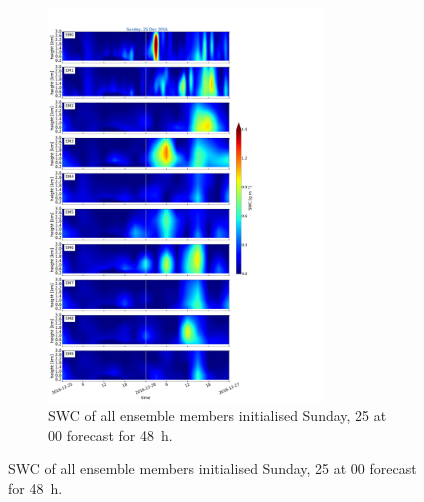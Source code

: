 \begin{figure}\ContinuedFloat
	\centering
	\begin{subfigure}[t]{\textwidth}
		\centering
		\includegraphics[trim={0cm 0cm 18.3cm 5.1cm},clip,width=0.8\textwidth]{./fig_09EM/20161225}
		\caption{SWC of all ensemble members initialised Sunday, \SI{25}{\dec} at 0\SI{0}{\UTC} forecast for \SI{48}{\hour}.}\label{fig:EM09_25}
	\end{subfigure}
\end{figure}
